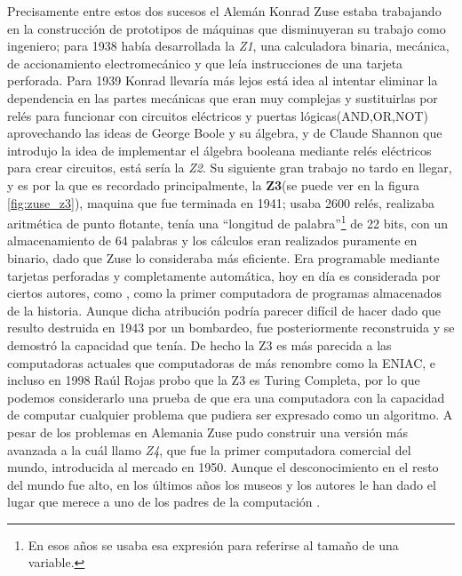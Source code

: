 \documentclass[letterpaper,12pt,oneside]{book}
\begin{document}
		
		Precisamente entre estos dos sucesos el Alemán Konrad
		Zuse estaba trabajando en la construcción de prototipos de máquinas que disminuyeran su trabajo como ingeniero; para 1938 había desarrollada la \textit{Z1},
		una calculadora binaria, mecánica, de accionamiento electromecánico y que leía instrucciones de una tarjeta perforada. Para 1939 Konrad llevaría más lejos está idea
		al intentar eliminar la dependencia en las partes mecánicas que eran muy complejas y sustituirlas por relés para funcionar con circuitos eléctricos y
		puertas lógicas(AND,OR,NOT) aprovechando las ideas de George Boole y su álgebra, y de Claude Shannon que introdujo la idea de implementar
		el álgebra booleana mediante relés eléctricos para crear circuitos, está sería la \textit{Z2}.	
		Su siguiente gran trabajo no tardo en llegar, y es por la que es recordado principalmente, la \textbf{Z3}(se puede ver en la figura \ref{fig:zuse_z3}), maquina que fue terminada en 1941; usaba 2600 relés, realizaba aritmética de punto flotante, tenía una ``longitud de palabra''\footnote{En esos años se usaba esa expresión para referirse al tamaño de una variable.} de 22 bits, con un almacenamiento de 64 palabras y los cálculos eran realizados puramente en binario, dado que Zuse lo consideraba más eficiente. Era programable mediante tarjetas
		perforadas y completamente automática, hoy en día es considerada por ciertos autores, como \cite{oregan_brief_2012}, como la primer computadora de programas almacenados de la historia.	
		Aunque dicha atribución podría parecer difícil de hacer
		dado que resulto destruida en 1943 por un bombardeo, fue posteriormente reconstruida y se demostró la capacidad que tenía. De hecho la Z3 es más parecida a las computadoras actuales que computadoras de más renombre como
		la ENIAC, e incluso en 1998 Raúl Rojas probo que la Z3 es Turing Completa, por lo que podemos considerarlo una prueba de que era
		una computadora con la capacidad de computar cualquier problema que pudiera ser expresado como un algoritmo. A pesar de los problemas en Alemania Zuse pudo construir
		una versión más avanzada a la cuál llamo \textit{Z4}, que fue la primer computadora comercial del mundo, introducida al mercado en 1950. Aunque el desconocimiento
		en el resto del mundo fue alto, en los últimos años los museos y los autores le han dado el lugar que merece a uno de los padres de la computación \cite[p.206]{ifrah_universal_2001}.
		
\end{document}
